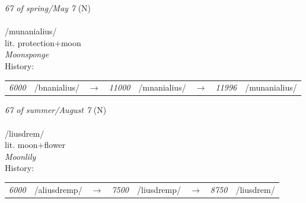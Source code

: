 \vspace{15pt}
\begin{nopagebreak}
 \textit{67 of spring/May 7} (N)\\
\\
\noindent /munanial{\textprimstress}ius/\\
\noindent lit. protection+moon\\
\noindent \textit{Moonsponge}\\


\noindent History:

\vspace{-0pt}
\hspace{40pt}
\begin{tabular}{ccc}
\textit{6000} & /bnanialius/&$\rightarrow$ & \textit{11000} & /mnanialius/&$\rightarrow$ & \textit{11996} & /munanialius/& \\
\end{tabular}

\vspace{20pt}\hline

\end{nopagebreak}
\filbreak



\vspace{15pt}
\begin{nopagebreak}
 \textit{67 of summer/August 7} (N)\\
\\
\noindent /li{\textprimstress}usdrem/\\
\noindent lit. moon+flower\\
\noindent \textit{Moonlily}\\


\noindent History:

\vspace{-0pt}
\hspace{40pt}
\begin{tabular}{ccc}
\textit{6000} & /aliusdremp/&$\rightarrow$ & \textit{7500} & /liusdremp/&$\rightarrow$ & \textit{8750} & /liusdrem/& \\
\end{tabular}

\vspace{20pt}\hline

\end{nopagebreak}
\filbreak



